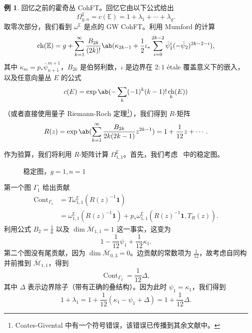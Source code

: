 \documentclass{amsart}
\theoremstyle{definition}
\newtheorem{exm}[thm]{例}
\theoremstyle{remark}
\theoremstyle{plain}
\theoremstyle{definition}
\theoremstyle{remark}
\newcommand{\E}{\mathbb{E}}
\newcommand{\Mbar}{\overline{\mathcal{M}}}
\newcommand{\1}{\mathbf{1}}
\newcommand{\2}{\mathbf{2}}
\newcommand{\3}{\mathbf{3}}
\DeclareMathOperator{\ch}{ch}
\DeclareMathOperator{\Cont}{Cont}
\begin{document}
\begin{exm}
    回忆之前的霍奇丛 CohFT。回忆它由以下公式给出
    \[ \Omega^{\E}_{g,n} = c(\E) = 1 + \lambda_1 + \cdots + \lambda_g. \]
    取零次部分，我们看到 $\omega^{\E}$ 是点的 GW CohFT。利用 Mumford 的计算
    \[ \ch(\E) = g + \sum_{k=1}^{\infty} \frac{B_{2k}}{(2k)!}\ab(\kappa_{2k-1} + \frac{1}{2}\iota_*\sum_{i=0}^{2k-2} \bar{\psi}_1^{i} (-\bar{\psi}_2)^{2k-2-i}), \]
    其中 $\kappa_{m} = p_* \bar{\psi}_{n+1}^{m+1}$，$B_{2k}$ 是伯努利数，$\iota$ 是边界在 $2:1$ \'etale 覆盖意义下的嵌入，以及任意向量丛 $E$ 的公式
    \[ c(E) = \exp \ab(-\sum_k (-1)^k (k-1)!\ch_k(E)) \]
    （或者直接使用量子 Riemann-Roch 定理\footnote{Coates-Givental 中有一个符号错误，该错误已传播到其余文献中。}），我们得到 $R$-矩阵
    \[ R(z) = \exp\ab( \sum_{k=1}^{\infty} \frac{B_{2k}}{2k(2k-1)} z^{2k-1}) = 1+\frac{1}{12}z + \cdots. \]

    作为验算，我们将利用 $R$-矩阵计算 $\Omega_{1,1}^{\E}$。首先，我们考虑~ 中的稳定图。
    \begin{figure}[htpb]
    \begin{center}
    \end{center}
    \caption{稳定图，$g=1, n=1$}%
    \label{fig:03graphloop}
    \end{figure}
    第一个图 $\Gamma_1$ 给出贡献
    \begin{align*}
        \Cont_{\Gamma_1} &= T\omega_{1,1}^{\E}(R(z)^{-1}\1) \\
        &= \omega_{1,1}^{\E}(R(z)^{-1}\1) + p_* \omega_{1,1}^{\E}(R(z)^{-1}\1, T_R(z)).
    \end{align*}
    利用公式 $B_2 = \frac{1}{6}$ 以及 $\dim \Mbar_{1,1} = 1$ 这一事实，这变为
    \[ 1 - \frac{1}{12}\psi_1 + \frac{1}{12} \kappa_1. \]
    第二个图没有尾贡献，因为 $\dim \Mbar_{0,3} = 0$。边贡献的常数项为 $\frac{1}{12}$，故考虑自同构并前推到 $\Mbar_{1,1}$，得到
    \[ \Cont_{\Gamma_2} = \frac{1}{12} \Delta, \]
    其中 $\Delta$ 表示边界除子（带有正确的叠结构）。因为此时 $\psi_1 = \kappa_1$，我们得到
    \[ 1+\lambda_1 = 1 + \frac{1}{12}(\kappa_1 - \psi_1 + \Delta) = 1 + \frac{1}{12} \Delta. \]
\end{exm}
\end{document}
